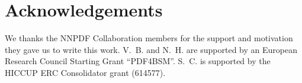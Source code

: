 \documentclass[preprint,12pt]{elsarticle}
\begin{document}
\section*{Acknowledgements}

We thanks the NNPDF Collaboration members for the support and
motivation they gave us to write this work. V.~B. and N.~H. are
supported by an European Research Council Starting Grant ``PDF4BSM''.
S.~C. is supported by the HICCUP ERC Consolidator grant (614577).














\end{document}
